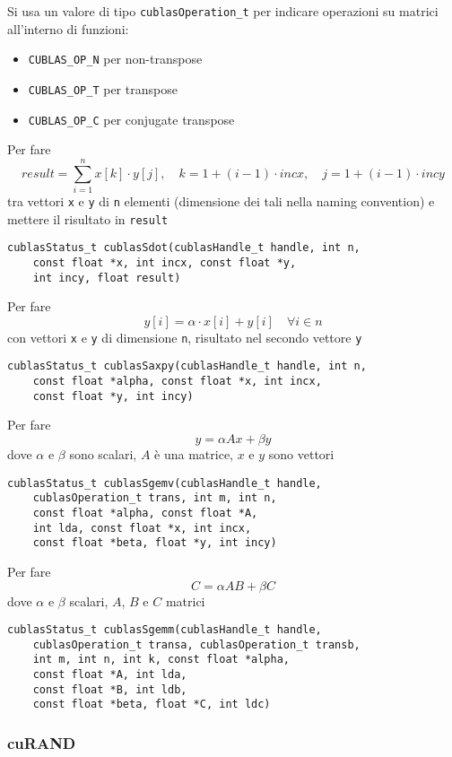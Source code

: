Si usa un valore di tipo \texttt{cublasOperation\_t} per indicare operazioni su matrici all'interno di funzioni: 
\begin{itemize}
	\item \texttt{CUBLAS\_OP\_N} per non-transpose
	\item \texttt{CUBLAS\_OP\_T} per transpose
	\item \texttt{CUBLAS\_OP\_C} per conjugate transpose
\end{itemize}

Per fare
$$ result = \sum_{i=1}^{n} x[k] \cdot y[j], \quad k = 1 + (i-1) \cdot incx, \quad j = 1 + (i-1) \cdot incy $$
tra vettori \texttt{x} e \texttt{y} di \texttt{n} elementi (dimensione dei tali nella naming convention) e mettere il risultato in \texttt{result}
\begin{verbatim}
cublasStatus_t cublasSdot(cublasHandle_t handle, int n, 
	const float *x, int incx, const float *y, 
	int incy, float result)
\end{verbatim}

Per fare 
$$ y[i] = \alpha \cdot x[i] + y[i] \quad \forall i \in n $$
con vettori \texttt{x} e \texttt{y} di dimensione \texttt{n}, risultato nel secondo vettore \texttt{y}
\begin{verbatim}
cublasStatus_t cublasSaxpy(cublasHandle_t handle, int n,
	const float *alpha, const float *x, int incx, 
	const float *y, int incy)
\end{verbatim}

Per fare 
$$ y = \alpha Ax + \beta y$$
dove $\alpha$ e $\beta$ sono scalari, $A$ è una matrice, $x$ e $y$ sono vettori
\begin{verbatim}
cublasStatus_t cublasSgemv(cublasHandle_t handle, 
	cublasOperation_t trans, int m, int n, 
	const float *alpha, const float *A, 
	int lda, const float *x, int incx, 
	const float *beta, float *y, int incy)
\end{verbatim}

Per fare
$$ C = \alpha AB + \beta C$$
dove $\alpha$ e $\beta$ scalari, $A$, $B$ e $C$ matrici
\begin{verbatim}
cublasStatus_t cublasSgemm(cublasHandle_t handle,
	cublasOperation_t transa, cublasOperation_t transb,
	int m, int n, int k, const float *alpha,
	const float *A, int lda,
	const float *B, int ldb,
	const float *beta, float *C, int ldc)
\end{verbatim}

\newpage

\subsubsection{cuRAND}


